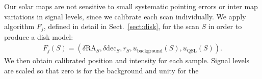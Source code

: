 \documentclass{aa}
\newcommand{\eqnl}[2]{\begin{eqnarray}\label{#1}#2\end{eqnarray}}
\newcommand{\s}[2]{{#1}_{\mathrm{#2}}}
\begin{document}
%
Our solar maps are not sensitive to small systematic pointing errors or inter map variations in signal levels, since we calibrate each scan individually.
We apply algorithm $F_j$,
defined in detail in Sect.~\ref{sect:disk},
for the scan $S$ in order to produce a disk model:
\eqnl{disk_model}{
F_j(S) = \left( \delta \mathrm{RA}_S, \delta \mathrm{dec}_S, r_S, \s{u}{background}(S), \s{u}{QSL}(S) \right) \text{.}
}
We then obtain calibrated position and intensity for each sample. Signal levels are scaled so that zero is for the background and unity for the 
\end{document}
